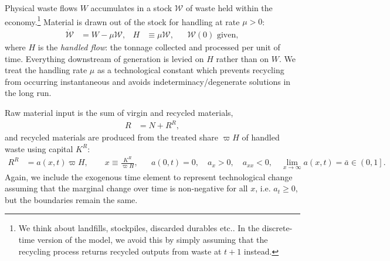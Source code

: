 Physical waste flows $W$ accumulates in a stock $\mathcal{W}$ of waste held within the economy.\footnote{We think about landfills, stockpiles, discarded durables etc.. In the discrete-time version of the model, we avoid this by simply assuming that the recycling process returns recycled outputs from waste at $t+1$ instead.} Material is drawn out of the stock for handling at rate $\mu>0$:
\begin{align}
\dot{\mathcal W} &= W-\mu\mathcal W,
&
H &\equiv \mu\mathcal W,
&&
\mathcal W(0)\text{ given},
\label{eq:sp:setup:wastestock}
\end{align}
where $H$ is the \emph{handled flow}: the tonnage collected and processed per unit of time. Everything downstream of generation is levied on $H$ rather than on $W$. We treat the handling rate $\mu$ as a technological constant which prevents recycling from occurring instantaneous and avoids indeterminacy/degenerate solutions in the long run.


 Raw material input is the sum of virgin and recycled materials,
\begin{align}
R &= N + R^R,
\label{eq:sp:setup:materials}
\end{align}
and recycled materials are produced from the treated share $\varpi H$ of handled waste using capital $K^R$:
\begin{align}
R^R &= a\!\left(x,t\right)\varpi H,
\qquad
x\equiv\frac{K^R}{\varpi H},
&&
a(0,t)=0,\quad a_x>0,\quad a_{xx}<0,\quad
\lim_{x\to\infty}a(x,t)=\bar a\in\left(0,1\right].
\label{eq:sp:setup:recycling}
\end{align}
Again, we include the exogenous time element to represent technological change assuming that the marginal change over time is non-negative for all $x$, i.e. $a_t\geq0$, but the boundaries remain the same.

